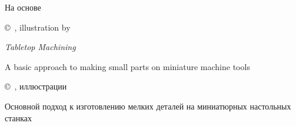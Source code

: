 \secdown

На основе 

\copyright\ , illustration by 

\emph{Tabletop Machining}

A basic approach to making small parts on miniature machine tools

\bigskip

\copyright\ , иллюстрации 

Основной подход к изготовлению мелких деталей на миниатюрных настольных станках

\clearpage



